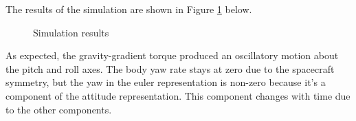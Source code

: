 \documentclass[]{aiaa-tc}%
\begin{document}
The results of the simulation are shown in Figure \ref{fig:SimResults} below.
	\begin{figure}[H]
		\centering
		\caption{Simulation results }
		\label{fig:SimResults}
	\end{figure}	

As expected, the gravity-gradient torque produced an oscillatory motion about the pitch and roll axes. The body yaw rate stays at zero due to the spacecraft symmetry, but the yaw in the euler representation is non-zero because it's a component of the attitude representation. This component changes with time due to the other components.
\end{document}
